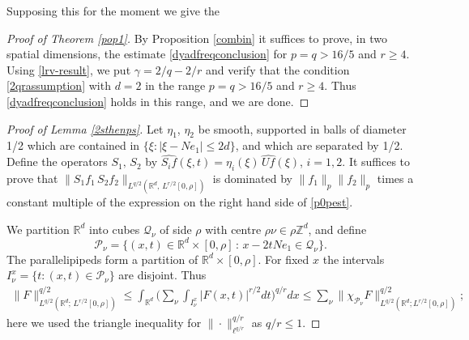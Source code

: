 \documentclass[11pt]{amsart}
\theoremstyle{definition}
\numberwithin{theorem}{section}
\numberwithin{definition}{section}
\numberwithin{equation}{section}
\def\nuv{\nu}
\newcommand{\Be}{\begin{equation}}
\newcommand{\Ee}{\end{equation}}
\renewcommand{\le}{\leqslant}
\renewcommand{\ge}{\geqslant}
\def\cP{{\mathcal {P}}}
\renewcommand{\le}{\leqslant}
\renewcommand{\ge}{\geqslant}
\begin{document}
\noindent Supposing this for the moment we give the
\begin{proof}[Proof of Theorem \ref{pop1}]
By  Proposition \ref{combin}
it suffices to prove, in two spatial dimensions, the estimate
\eqref{dyadfreqconclusion}
for $p=q>16/5$ and $r\ge 4$. Using \eqref{lrv-result}, we
put $\gamma=2/q-2/r$ and verify that
the condition   \eqref{2qrassumption} with $d=2$   in the
range $p=q>16/5$ and $r\ge 4$.
Thus \eqref{dyadfreqconclusion} holds in this range, and we are done.
\end{proof}



\begin{proof}[Proof of Lemma \ref{2sthenps}]
Let $\eta_1$, $\eta_2$ be smooth, supported in balls of diameter 1/2
which are contained in $\{\xi:|\xi-Ne_1|\le 2d\}$, and which are separated by
1/2.  Define the  operators $S_1,\,S_2$ by
$\widehat{S_i f}(\xi,t)=\eta_i(\xi)\, \widehat
{Uf}(\xi)$, $i=1,2$.
It suffices to prove that
$\|S_1f_1\,S_2
f_2\|_{L^{q/2}(\mathbb{R}^d\!,\,L^{r/2}[0,\rho])}$ is dominated by $\|f_1\|_p\|f_2\|_p$ times a constant multiple of the expression on the right hand side of
\eqref{p0pest}.


We partition $\mathbb{R}^d$ into cubes $\mathcal{Q}_\nuv$ of side
 $\rho$ with centre $\rho\nuv\in \rho\mathbb{Z}^d$,
 and define \Be\mathcal{P}_\nuv=
\{ (x,t)\in \mathbb{R}^d\times [0,\rho]\,:\,x-2tNe_1\in
\mathcal{Q}_\nuv\}.
\Ee The parallelipipeds form a partition of
$\mathbb{R}^d\times[0,\rho]$.
For fixed $x$ the intervals
 $I^x_\nuv= \{t:(x,t)\in \cP_\nuv\}$ are disjoint.
Thus
\begin{align*}
\|F\|^{q/2}_{L^{q/2}(\mathbb{R}^d;\,L^{r/2}[0,\rho])}\le
\int_{\mathbb{R}^d}\Big(\sum_{\nuv}\int_{I^x_\nuv}|F(x,t)|^{r/2}dt\Big)^{q/r}
dx\le\sum_{\nuv}\big\|\chi_{\cP_\nuv}F\big\|_{L^{q/2}(\mathbb
R^d;L^{r/2}[0,\rho])}^{q/2};
\end{align*}
here
we used the triangle inequality for
$\|\cdot\|_{\ell^{q/r}}^{q/r}$ as $q/r\le 1$.





\end{proof}
\end{document}
